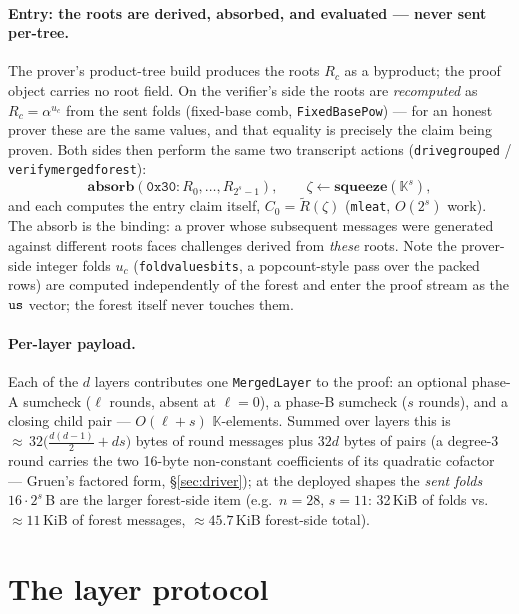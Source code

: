 \documentclass[11pt]{article}
\newcommand{\K}{\mathbb{K}}            %
\newcommand{\mle}[1]{\widetilde{#1}}
\newcommand{\code}[1]{{\def\_{\textunderscore\allowbreak}\texttt{#1}}}
\theoremstyle{definition}
\begin{document}
\paragraph{Entry: the roots are derived, absorbed, and evaluated ---
never sent per-tree.}
The prover's product-tree build produces the roots $R_c$ as a byproduct;
the proof object carries no root field.  On the verifier's side the
roots are \emph{recomputed} as $R_c = \alpha^{u_c}$ from the sent folds
(fixed-base comb, \code{FixedBasePow}) --- for an honest prover these
are the same values, and that equality is precisely the claim being
proven.  Both sides then perform the same two transcript actions
(\code{drive\_grouped} / \code{verify\_merged\_forest}):
\[
  \textbf{absorb}(\mathtt{0x30}: R_0, \dots, R_{2^s-1}),
  \qquad
  \zeta \leftarrow \textbf{squeeze}(\K^s),
\]
and each computes the entry claim itself,
$C_0 = \mle{R}(\zeta)$ (\code{mle\_at}, $O(2^s)$ work).  The absorb is
the binding: a prover whose subsequent messages were generated against
different roots faces challenges derived from \emph{these} roots.  Note
the prover-side integer folds $u_c$ (\code{fold\_values\_bits}, a
popcount-style pass over the packed rows) are computed independently of
the forest and enter the proof stream as the $\code{us}$ vector; the
forest itself never touches them.

\paragraph{Per-layer payload.}
Each of the $d$ layers contributes one \code{MergedLayer} to the proof:
an optional phase-A sumcheck ($\ell$ rounds, absent at $\ell = 0$), a
phase-B sumcheck ($s$ rounds), and a closing child pair --- $O(\ell+s)$
$\K$-elements.  Summed over layers this is
${\approx}\,32\big(\tfrac{d(d-1)}{2} + ds\big)$ bytes of round messages
plus $32d$ bytes of pairs (a degree-3 round carries the two 16-byte
non-constant coefficients of its quadratic cofactor --- Gruen's factored
form, \S\ref{sec:driver}); at the deployed shapes the
\emph{sent folds} $16\cdot 2^s$\,B are the larger forest-side item
(e.g.\ $n = 28$, $s = 11$: 32\,KiB of folds vs.\ ${\approx}11$\,KiB of
forest messages, ${\approx}45.7$\,KiB forest-side total).

\section{The layer protocol}
\label{sec:layers}
\end{document}
